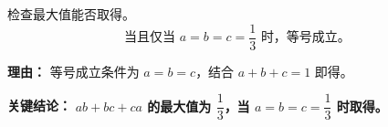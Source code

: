 \begin{examplebox}
\begin{description}[style=nextline, leftmargin=2.8em, labelsep=0.5em, itemsep=0.45em]
    \item[\textbf{第三步（取等验证）：}] 检查最大值能否取得。
    \[
    \text{当且仅当 } a=b=c=\frac{1}{3} \text{ 时，等号成立。}
    \]
    \par\textbf{理由：}
    等号成立条件为 $a=b=c$，结合 $a+b+c=1$ 即得。
\end{description}

\textbf{\textcolor{CExample}{关键结论：}} \textbf{$ab+bc+ca$ 的最大值为 $\dfrac{1}{3}$，当 $a=b=c=\dfrac{1}{3}$ 时取得。}
\end{examplebox}
